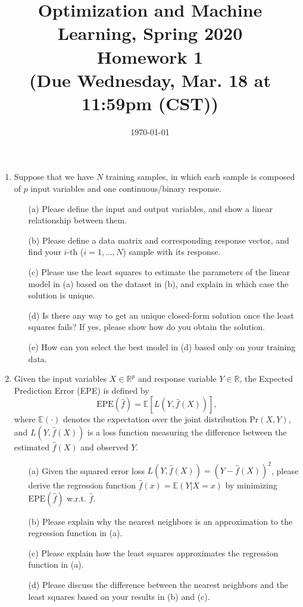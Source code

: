 \documentclass[10pt]{article}
\begin{document}
\date{\today}
\title{Optimization and Machine Learning, Spring 2020 \\
Homework 1\\
\small (Due Wednesday, Mar. 18 at 11:59pm (CST))}
\maketitle
\begin{enumerate}[1.]


		\item  Suppose that we have $N$ training samples, in which
		each sample is composed of $p$ input variables and one continuous/binary response.
		\begin{itemize}
			\item[(a)] Please define the input and output variables, and show a linear relationship between them.~
			\item[(b)] Please define a data matrix and corresponding response vector, and find your $i$-th ($i=1,...,N$) sample with its response.~
			\item[(c)] Please use the least squares to estimate the parameters of the linear model in (a) based on the dataset in (b), and explain in which case the solution is unique.~
			\item[(d)] Is there any way to get an unique closed-form solution once the least squares fails? If yes, please show how do you obtain the solution.~
			\item[(e)] How can you select the best model in (d) based only on your training data.~
		\end{itemize}
               
		\item  Given the input variables $X \in \mathbb{R}^p$ and response variable $Y \in \mathbb{R}$, the Expected Prediction Error (EPE) is defined by 
		\begin{equation}
		\text{EPE}(\hat{f}) = \mathbb{E}[L(Y,\hat{f}(X))],
		\end{equation}
		where $\mathbb{E}(\cdot)$ denotes the expectation over the joint distribution $\text{Pr}(X,Y)$, and $L(Y,\hat{f}(X))$ is a loss function measuring the difference between the estimated $\hat{f}(X)$ and observed $Y$.
		\begin{itemize}
			\item[(a)] Given the squared error loss $L(Y,\hat{f}(X))=(Y-\hat{f}(X))^2$, please derive the regression function $\hat{f}(x) = \mathbb{E}(Y|X=x)$ by minimizing $\text{EPE}(\hat{f})$ w.r.t. $\hat{f}$.~ 
			\item[(b)] Please explain why the nearest neighbors is an approximation to the regression function in (a).~
			\item[(c)] Please explain how the least squares approximates the regression function in (a).~
			\item[(d)] Please discuss the difference between the nearest neighbors and the least squares based on your results in (b) and (c).~ 
		\end{itemize}




\end{enumerate}
\end{document}
